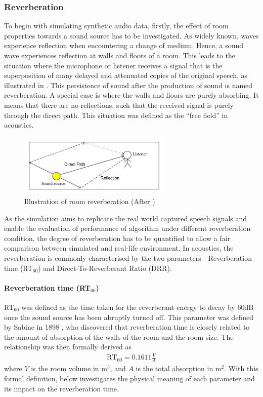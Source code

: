 \documentclass[a4paper,twoside,12pt,hidelinks]{article}
\begin{document}
\subsubsection{Reverberation}
\label{sect:reverberationreview}
To begin with simulating synthetic audio data, firstly, the effect of room properties towards a sound source has to be investigated. As widely known, waves experience reflection when encountering a change of medium. Hence, a sound wave experiences reflection at walls and floors of a room. This leads to the situation where the microphone or listener receives a signal that is the superposition of many delayed and attenuated copies of the original speech, as illustrated in . This persistence of sound after the production of sound is named reverberation. A special case is where the walls and floors are purely absorbing. It means that there are no reflections, such that the received signal is purely through the direct path. This situation was defined as the ``free field'' in acoustics.

\begin{figure}[H]
\begin{center}
\includegraphics[width=0.65\textwidth]{reflections}
\end{center}
\caption{Illustration of room reverberation (After \cite{Yu2015})}
\label{fig:reverberation}
\end{figure}

As the simulation aims to replicate the real world captured speech signals and enable the evaluation of performance of algorithm under different reverberation condition, the degree of reverberation has to be quantified to allow a fair comparison between simulated and real-life environment. In acoustics, the reverberation is commonly characterised by the two parameters - Reverberation time (RT$_{60}$) and Direct-To-Reverberant Ratio (DRR). 
\paragraph{Reverberation time (RT$_{60}$)}
RT$_{60}$ was defined as the time taken for the reverberant energy to decay by 60dB once the sound source has been abruptly turned off. This parameter was defined by Sabine in 1898 \cite{Sabine1966CollectedAcoustics}, who discovered that reverberation time is closely related to the amount of absorption of the walls of the room and the room size. The relationship was then formally derived as
\begin{align}
\text{RT}_{{60}}=0.1611{\frac  {V}{A}} \label{eq:sabine}
\end{align}
where $V$ is the room volume in $\text{m}^3$, and $A$ is the total absorption in $\text{m}^2$. With this formal definition, below investigates the physical meaning of each parameter and its impact on the reverberation time.
\end{document}
